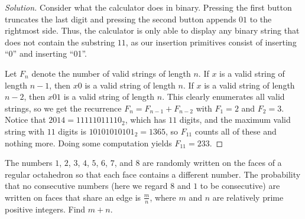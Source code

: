 \ifsolutions
\begin{proof}[Solution]
Consider what the calculator does in binary. Pressing the first button truncates
the last digit and pressing the second button appends $01$ to the rightmost
side. Thus, the calculator is only able to display any binary string that does
not contain the substring $11$, as our insertion primitives consist of inserting
``0'' and inserting ``01''.

Let $F_n$ denote the number of valid strings of length $n$. If $x$ is a valid
string of length $n - 1$, then $x0$ is a valid string of length $n$. If $x$ is a
valid string of length $n - 2$, then $x01$ is a valid string of length $n$. This
clearly enumerates all valid strings, so we get the recurrence $F_n = F_{n - 1}
+ F_{n - 2}$ with $F_1 = 2$ and $F_2 = 3$. Notice that $2014 = 11111011110_2$,
which has $11$ digits, and the maximum valid string with $11$ digits is
$10101010101_2 = 1365$, so $F_{11}$ counts all of these and nothing more. Doing
some computation yields $F_{11} = \boxed{233}$.
\end{proof}
\fi

\begin{prb}[2001 AIME I-15]
The numbers $1$, $2$, $3$, $4$, $5$, $6$, $7$, and $8$ are randomly written on
the faces of a regular octahedron so that each face contains a different number.
The probability that no consecutive numbers (here we regard $8$ and $1$ to be
consecutive) are written on faces that share an edge is $\frac{m}{n}$, where $m$
and $n$ are relatively prime positive integers. Find $m + n$.
\end{prb}

